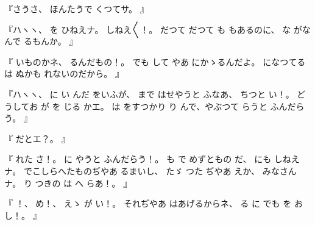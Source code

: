 『さうさ、
%
ほんたうで
くつてサ。
』

『ハヽヽ、
%
を
ひねえナ。
%
しねえ〳〵！。
%
だつて
だつて
も
もあるのに、
%
な
がなんで
るもんか。
』

『
いものかネ、
%
るんだもの！。
%
でも
して
やあ
にかゝるんだよ。
%
になつてる
は
ぬかも
れないのだから。
』

『ハヽヽ、
%
に
い
んだ
をいふが、
%
まで
はせやうと
ふなあ、
%
ちつと
い！。
%
どうしてお
が
を
じる
かエ。
%
は
をすつかり
り
んで、やぶつて
らうと
ふんだらう。
』

『
だとエ？。
』

『
れた
さ！。
%
に
やうと
ふんだらう！。
%
も
で
めずともの
だ、
%
にも
しねえナ。
%
でこしらへたものぢやあ
るまいし、
%
たゞ
つた
ぢやあ
えか、
%
みなさんナ。
%
り
つきの
は
へ
らあ！。
』

『
！、
%
め！、
%
えゝ
が
い！。
%
それぢやあ
はあげるからネ、
%
る
に
でも
を
お
し！。
』
